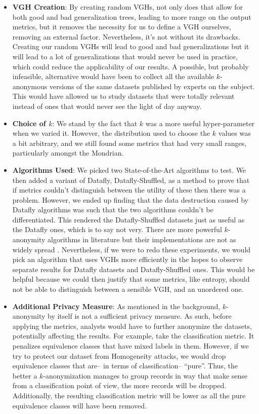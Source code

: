 \begin{itemize}
    \item \textbf{VGH Creation}: By creating random VGHs, not only does that allow for both good and bad generalization trees, leading to more range on the output metrics, but it removes the necessity for us to define a VGH ourselves, removing an external factor. Nevertheless, it's not without its drawbacks. Creating our random VGHs will lead to good and bad generalizations but it will lead to a lot of generalizations that would never be used in practice, which could reduce the applicability of our results. A possible, but probably infeasible, alternative would have been to collect all the available $k$-anonymous versions of the same datasets published by experts on the subject. This would have allowed us to study datasets that were totally relevant instead of ones that would never see the light of day anyway.
    \item \textbf{Choice of $k$}: We stand by the fact that $k$ was a more useful hyper-parameter when we varied it. However, the distribution used to choose the $k$ values was a bit arbitrary, and we still found some metrics that had very small ranges, particularly amongst the Mondrian.
    \item \textbf{Algorithms Used}: We picked two State-of-the-Art algorithms to test. We then added a variant of Datafly, Datafly-Shuffled, as a method to prove that if metrics couldn't distinguish between the utility of these then there was a problem. However, we ended up finding that the data destruction caused by Datafly algorithms was such that the two algorithms couldn't be differentiated. This rendered the Datafly-Shuffled datasets just as useful as the Datafly ones, which is to say not very. There are more powerful $k$-anonymity algorithms in literature but their implementations are not as widely spread \cite{ilm,samarati_algo, cm_granularity_metric}. Nevertheless, if we were to redo these experiments, we would pick an algorithm that uses VGHs more efficiently in the hopes to observe separate results for Datafly datasets and Datafly-Shuffled ones. This would be helpful because we could then justify that some metrics, like entropy, should not be able to distinguish between a sensible VGH, and an unordered one.
    \item \textbf{Additional Privacy Measure}: As mentioned in the background, $k$-anonymity by itself is not a sufficient privacy measure. As such, before applying the metrics, analysts would have to further anonymize the datasets, potentially affecting the results. For example, take the classification metric. It penalizes equivalence classes that have mixed labels in them. However, if we try to protect our dataset from Homogeneity attacks, we would drop equivalence classes that are-- in terms of classification-- 
   ``pure''. Thus, the better a $k$-anonymization manages to group records in way that make sense from a classification point of view, the more records will be dropped. Additionally, the resulting classification metric will be lower as all the pure equivalence classes will have been removed.
\end{itemize}

